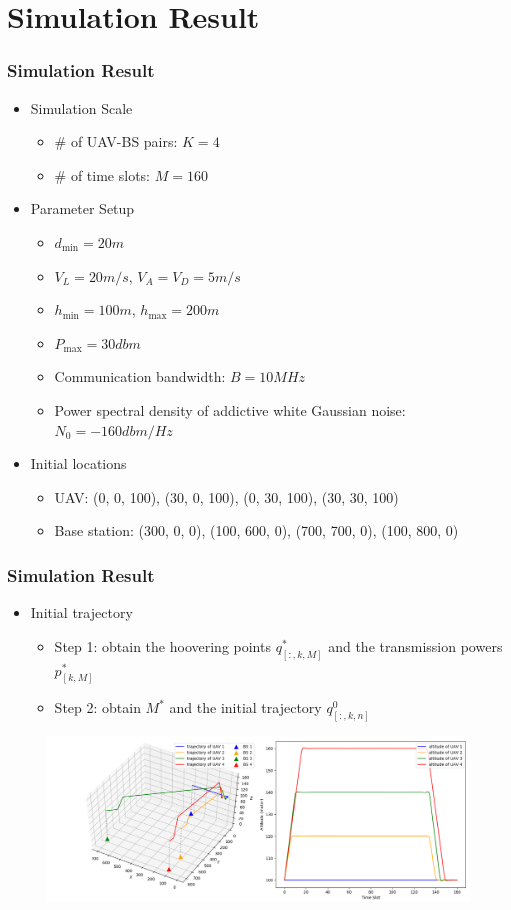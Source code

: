 \documentclass[handout,11.5pt]{beamer}
\begin{document}
\section{Simulation Result}
\begin{frame}
	\frametitle{Simulation Result}
	\begin{itemize}
		\item Simulation Scale
		\begin{itemize}
			\item \# of UAV-BS pairs: $K = 4$
			\item \# of time slots: $M = 160$
		\end{itemize}
		\item Parameter Setup
		\begin{itemize}
			\item $d_{\text{min}} = 20 m$
			\item $V_L = 20 m/s$, $V_A = V_D = 5 m/s$ 
			\item $h_{\text{min}} = 100m$, $h_{\text{max}} = 200m$
			\item $P_{\text{max}} = 30dbm$
			\item Communication bandwidth: $B = 10 MHz$
			\item Power spectral density of addictive white Gaussian noise: $N_0 = -160 dbm/Hz$
		\end{itemize}
		\item Initial locations
		\begin{itemize}
			\item UAV: (0, 0, 100), (30, 0, 100), (0, 30, 100), (30, 30, 100)
			\item Base station: (300, 0, 0), (100, 600, 0), (700, 700, 0), (100, 800, 0)
		\end{itemize}
	\end{itemize}
\end{frame}
\begin{frame}
	\frametitle{Simulation Result}
	\begin{itemize}
		\item Initial trajectory
		\begin{itemize}
			\item Step 1: obtain the hoovering points $q_{[:, k, M]}^*$ and the transmission powers $p_{[k, M]}^*$
			\item Step 2: obtain $M^*$ and the initial trajectory $q_{[:, k, n]}^0$
		\end{itemize}
	\end{itemize}
	
	\begin{figure}
		\centering
		\includegraphics[width=.9\linewidth]{init_trajectory.png}
	\end{figure}
\end{frame}
\end{document}
